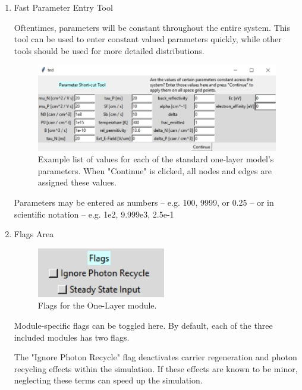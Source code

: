 \documentclass[11pt,letterpaper,titlepage]{article}
\begin{document}
\begin{enumerate}
				\item Fast Parameter Entry Tool
				
				\par Oftentimes, parameters will be constant throughout the entire system. This tool can be used to enter constant valued parameters quickly, while other tools should be used for more detailed distributions.
				
				\begin{figure}[H]
					\label{fig:fast_param_entry_tool}
					\centering
					\includegraphics[scale=0.7]{"fast_param_entry_tool"}
					\caption{Example list of values for each of the standard one-layer model's parameters. When "Continue" is clicked, all nodes and edges are assigned these values.}
				\end{figure}
			
				\par Parameters may be entered as numbers – e.g. 100, 9999, or 0.25 – or in scientific notation – e.g. 1e2, 9.999e3, 2.5e-1
				
				\item Flags Area
				
				\begin{figure}[H]
					\label{fig:flags}
					\centering
					\includegraphics[scale=1.5]{"flags"}
					\caption{Flags for the One-Layer module.}
				\end{figure}
				
				\par Module-specific flags can be toggled here. By default, each of the three included modules has two flags.
				
				\par The "Ignore Photon Recycle" flag deactivates carrier regeneration and photon recycling effects within the simulation. If these effects are known to be minor, neglecting these terms can speed up the simulation.
				

\end{enumerate}
\end{document}
